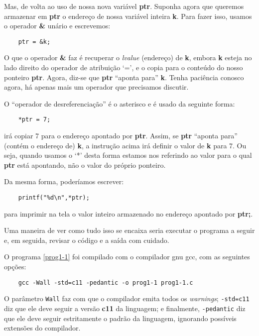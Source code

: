 Mas, de volta ao uso de nossa nova variável \textbf{ptr}. Suponha agora que queremos armazenar em \textbf{ptr} o endereço de nossa variável inteira \textbf{k}. Para fazer isso, usamos o operador \textbf{\&} unário e escrevemos:

\begin{lstlisting}
	ptr = &k;
\end{lstlisting}

O que o operador \textbf{\&} faz é recuperar o \textit{lvalue} (endereço) de \textbf{k}, embora \textbf{k} esteja no lado direito do operador de atribuição `=', e o copia para o conteúdo do nosso ponteiro \textbf{ptr}. Agora, diz-se que \textbf{ptr} ``aponta para'' \textbf{k}. Tenha paciência conosco agora, há apenas mais um operador que precisamos discutir.

O ``operador de desreferenciação'' é o asterisco e é usado da seguinte forma:

\begin{lstlisting}
	*ptr = 7;
\end{lstlisting}
irá copiar 7 para o endereço apontado por \textbf{ptr}. Assim, se \textbf{ptr} ``aponta para'' (contém o endereço de) \textbf{k}, a instrução acima irá definir o valor de \textbf{k} para 7. Ou seja, quando usamos o `*' desta forma estamos nos referindo ao valor para o qual \textbf{ptr} está apontando, não o valor do próprio ponteiro.

Da mesma forma, poderíamos escrever:
\begin{lstlisting}
	printf("%d\n",*ptr);
\end{lstlisting}
para imprimir na tela o valor inteiro armazenado no endereço apontado por \textbf{ptr;}.

Uma maneira de ver como tudo isso se encaixa seria executar o programa a seguir e, em seguida, revisar o código e a saída com cuidado.



O programa \ref{prog1-1} foi compilado com o compilador gnu gcc, com as seguintes opções:\\
\lstconsolestyle
\begin{lstlisting}
	gcc -Wall -std=c11 -pedantic -o prog1-1 prog1-1.c	
\end{lstlisting}

O parâmetro \texttt{Wall} faz com que o compilador emita todos os \textit{warnings}; \texttt{-std=c11} diz que ele deve seguir a versão \textbf{c11} da linguagem; e finalmente, \texttt{-pedantic} diz que ele deve seguir estritamente o padrão da linguagem, ignorando possíveis extensões do compilador.

